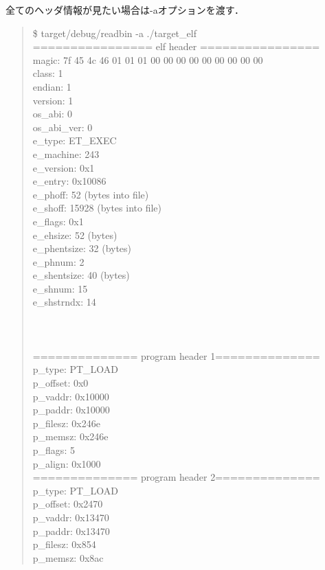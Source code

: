 \documentclass[12pt,a4paper,dvipdfmx]{jsarticle}
\begin{document}
全てのヘッダ情報が見たい場合は-aオプションを渡す．
\begin{quote}
\$ target/debug/readbin -a ./target\_elf \\
================ elf header ================ \\
magic:	7f 45 4c 46 01 01 01 00 00 00 00 00 00 00 00 00 \\
class:		1 \\
endian:		1 \\
version:	1 \\
os\_abi:		0 \\
os\_abi\_ver:	0 \\
e\_type:		ET\_EXEC \\
e\_machine:	243 \\
e\_version:	0x1 \\
e\_entry:	0x10086 \\
e\_phoff:	52 (bytes into file) \\
e\_shoff:	15928 (bytes into file) \\
e\_flags:	0x1 \\
e\_ehsize:	52 (bytes) \\
e\_phentsize:	32 (bytes) \\
e\_phnum:	2 \\
e\_shentsize:	40 (bytes) \\
e\_shnum:	15 \\
e\_shstrndx:	14 \\
 \\
 \\
 \\
============== program header 1============== \\
p\_type:		PT\_LOAD \\
p\_offset:	0x0 \\
p\_vaddr:	0x10000 \\
p\_paddr:	0x10000 \\
p\_filesz:	0x246e \\
p\_memsz:	0x246e \\
p\_flags:	5 \\
p\_align:	0x1000 \\
============== program header 2============== \\
p\_type:		PT\_LOAD \\
p\_offset:	0x2470 \\
p\_vaddr:	0x13470 \\
p\_paddr:	0x13470 \\
p\_filesz:	0x854 \\
p\_memsz:	0x8ac \\

\end{quote}
\end{document}
